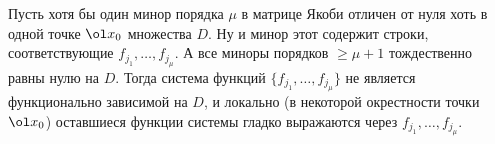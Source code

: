 
\label{Len}
Пусть хотя бы один минор порядка $\mu$ в матрице Якоби отличен от нуля хоть в одной точке $\ol x_0$ множества $D$. Ну и минор этот содержит строки, соответствующие $f_{j_1},\dots,f_{j_\mu}$.
А все миноры порядков $\ge\mu+1$ тождественно равны нулю на $D$.
Тогда система функций $\{f_{j_1},\dots,f_{j_\mu}\}$ не является функционально зависимой на $D$, и локально (в некоторой окрестности точки $\ol x_0$) оставшиеся функции системы гладко
выражаются через $f_{j_1},\dots,f_{j_\mu}$.

